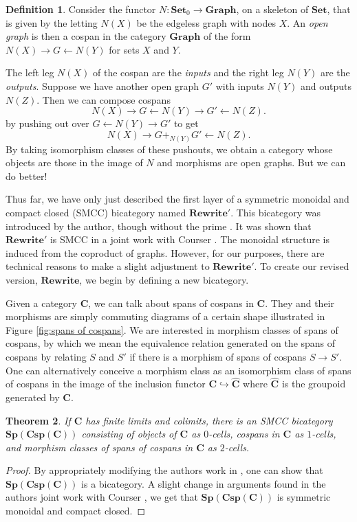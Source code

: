 \documentclass[11pt]{amsart}
\newtheorem{thm}{Theorem}[section]
\theoremstyle{definition}
\newtheorem{defn}[thm]{Definition}
\begin{document}
\begin{defn}
\label{def:Open Graph}
	Consider the functor $N \colon \mathbf{Set}_0 \to \mathbf{Graph}$, on a skeleton of $\mathbf{Set}$, that is given by the letting $N(X)$ be the edgeless graph with nodes $X$.  An \emph{open graph} is then a cospan in the category $\mathbf{Graph}$ of the form $N(X) \to G \gets N(Y)$ for sets $X$ and $Y$.
\end{defn}

The left leg $N(X)$ of the cospan are the \emph{inputs} and the right leg $N(Y)$ are the \emph{outputs}.  Suppose we have another open graph $G'$ with inputs $N(Y)$ and outputs $N(Z)$.  Then we can compose cospans 
\[
N(X) \to G \gets N(Y) \to G' \gets N(Z). 
\] 
by pushing out over $G \gets N(Y) \to G'$ to get 
\[
N(X) \to G +_{N(Y)} G' \gets N(Z).
\] 
By taking isomorphism classes of these pushouts, we obtain a category whose objects are those in the image of $N$ and morphisms are open graphs. But we can do better! 

Thus far, we have only just described the first layer of a symmetric monoidal and compact closed (SMCC) bicategory named $\mathbf{Rewrite'}$.  This bicategory was introduced by the author, though without the prime \cite{Cicala_SpansCospans}. It was shown that $\mathbf{Rewrite'}$ is SMCC in a joint work with Courser \cite{CicalaCourser_BicatSpansCospan}. The monoidal structure is induced from the coproduct of graphs.  However, for our purposes, there are technical reasons to make a slight adjustment to $\mathbf{Rewrite'}$.  To create our revised version, $\mathbf{Rewrite}$, we begin by defining a new bicategory.

Given a category $\mathbf{C}$, we can talk about spans of cospans in $\mathbf{C}$.  They and their morphisms are simply commuting diagrams of a certain shape illustrated in Figure \ref{fig:spans of cospans}.  We are interested in morphism classes of spans of cospans, by which we mean the equivalence relation generated on the spans of cospans by relating $S$ and $S'$ if there is a morphism of spans of cospans $S \to S'$.  One can alternatively conceive a morphism class as an isomorphism class of spans of cospans in the image of the inclusion functor $\mathbf{C} \hookrightarrow \widehat{\mathbf{C}}$ where $\widehat{\mathbf{C}}$ is the groupoid generated by $\mathbf{C}$.   

\begin{thm}
\label{thm:SpCspC is SMCC bicategory}
	If $\mathbf{C}$ has finite limits and colimits, there is an SMCC bicategory $\mathbf{Sp}(\mathbf{Csp}(\mathbf{C}))$ consisting of objects of $\mathbf{C}$ as $0$-cells, cospans in $\mathbf{C}$ as $1$-cells, and morphism classes of spans of cospans in $\mathbf{C}$ as $2$-cells. 
\end{thm}
\begin{proof}
	By appropriately modifying the authors work in \cite{Cicala_SpansCospans}, one can show that $\mathbf{Sp}(\mathbf{Csp}(\mathbf{C}))$ is a bicategory.  A slight change in arguments found in the authors joint work with Courser \cite{CicalaCourser_BicatSpansCospan}, we get that $\mathbf{Sp}(\mathbf{Csp}(\mathbf{C}))$ is symmetric monoidal and compact closed.
\end{proof}
\end{document}
